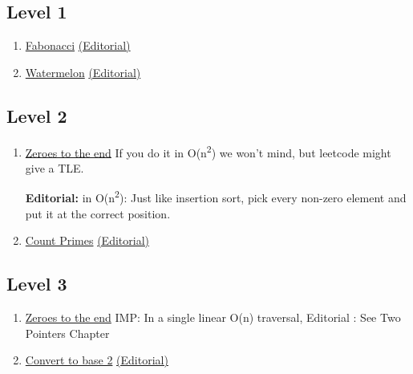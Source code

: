 \documentclass[13pt,oneside,a4paper]{book}
\begin{document}
\subsection{Level 1}
\begin{enumerate}
        \item \href{https://leetcode.com/problems/fibonacci-number/}{Fabonacci} \href{https://leetcode.com/problems/fibonacci-number/discuss/218301/C%2B%2B-4-Solutions-Explained-Recursive-or-Iterative-with-DP-or-Imperative-or-Binet's}{(Editorial)}
                \item \href{https://codeforces.com/contest/4/problem/A}{Watermelon} \href{https://leetcode.com/problems/fibonacci-number/discuss/218301/C%2B%2B-4-Solutions-Explained-Recursive-or-Iterative-with-DP-or-Imperative-or-Binet's}{(Editorial)}
\end{enumerate}

\subsection{Level 2}
\begin{enumerate}
        \item \href{https://leetcode.com/problems/move-zeroes/}{Zeroes to the end} If you do it in O(n\textsuperscript{2}) we won't mind, but leetcode might give a TLE. 
                
                \textbf{Editorial:} in O(n\textsuperscript{2}): Just like insertion sort, pick every non-zero element and put it at the correct position.
        \item \href{https://leetcode.com/problems/count-primes/}{Count Primes} \href{https://leetcode.com/problems/count-primes/discuss/57594/My-easy-one-round-c%2B%2B-code}{(Editorial)}
\end{enumerate}

\subsection{Level 3}
\begin{enumerate}
        \item \href{https://leetcode.com/problems/move-zeroes/}{Zeroes to the end} IMP: In a single linear O(n) traversal, Editorial : See Two Pointers Chapter
        \item \href{https://leetcode.com/problems/convert-to-base-2/}{Convert to base 2} \href{https://www.geeksforgeeks.org/convert-number-negative-base-representation/}{(Editorial)}
\end{enumerate}
\end{document}
